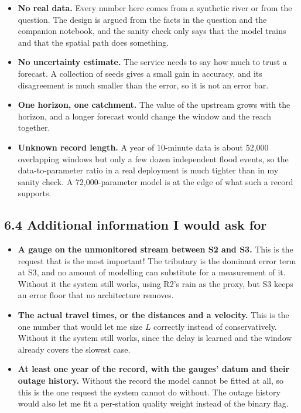 \documentclass[11pt,letterpaper]{article}
\begin{document}
\begin{itemize}
\item \textbf{No real data.} Every number here comes from a synthetic river or from
the question. The design is argued from the facts in the question and the companion
notebook, and the sanity check only says that the model trains and that the spatial
path does something.
\item \textbf{No uncertainty estimate.} The service needs to say how much to trust a
forecast. A collection of seeds gives a small gain in accuracy, and its disagreement
is much smaller than the error, so it is not an error bar.
\item \textbf{One horizon, one catchment.} The value of the upstream grows with the
horizon, and a longer forecast would change the window and the reach together.
\item \textbf{Unknown record length.} A year of 10-minute data is about 52{,}000
overlapping windows but only a few dozen independent flood events, so the
data-to-parameter ratio in a real deployment is much tighter than in my sanity
check. A 72{,}000-parameter model is at the edge of what such a record supports.
\end{itemize}

\subsection*{6.4 Additional information I would ask for}

\begin{itemize}
\item \textbf{A gauge on the unmonitored stream between S2 and S3.} This is the
request that is the most important! The tributary is the dominant error term at S3, and no amount
of modelling can substitute for a measurement of it. Without it the system still
works, using R2's rain as the proxy, but S3 keeps an error floor that no
architecture removes.
\item \textbf{The actual travel times, or the distances and a velocity.} This is the
one number that would let me size $L$ correctly instead of conservatively. Without
it the system still works, since the delay is learned and the window already covers
the slowest case.
\item \textbf{At least one year of the record, with the gauges' datum and their outage
history.} Without the record the model cannot be fitted at all, so this is the one
request the system cannot do without. The outage history would also let me fit a
per-station quality weight instead of the binary flag.
\end{itemize}
\end{document}
